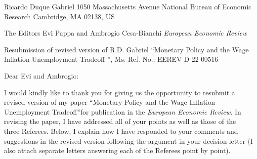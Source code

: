\documentclass[12pt]{article}
\begin{document}
\noindent Ricardo Duque Gabriel \hfill{1050 Massachusetts Avenue}\newline
National Bureau of Economic Research \hfill{Cambridge, MA 02138, US}\newline
{}\newline

\bigskip


\bigskip \noindent The Editors \newline
Evi Pappa and Ambrogio Cesa-Bianchi \newline
\textit{European Economic Review}\newline

\medskip

\noindent Resubmission of revised version of R.D. Gabriel \textquotedblleft Monetary Policy and the Wage Inflation-Unemployment Tradeoff \textquotedblright , Ms. Ref. No.: EEREV-D-22-00516 \newline

\medskip

\noindent Dear Evi and Ambrogio:\newline


\noindent I would kindly like to thank you for giving us the opportunity to resubmit a revised version of my paper \textquotedblleft Monetary Policy and the Wage Inflation-Unemployment Tradeoff\textquotedblright for publication in the \textit{European Economic Review}. In revising the paper, I have addressed all of your points as well as those of the three Referees. Below, I explain how I have responded to your comments and suggestions in the revised version following the argument in your decision letter (I also attach separate letters answering each of the Referees point by point).
\bigskip
\end{document}
